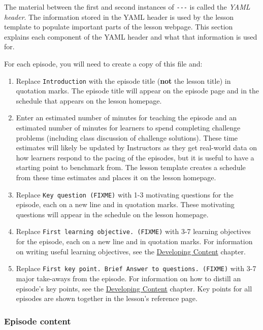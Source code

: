 \documentclass[
]{book}
\providecommand{\tightlist}{%
  \setlength{\itemsep}{0pt}\setlength{\parskip}{0pt}}
\begin{document}
The material between the first and second instances of \texttt{-\/-\/-} is called the \emph{YAML header}. The information
stored in the YAML header is used by the lesson template to populate important parts of the lesson webpage.
This section explains each component of the YAML header and what that information is used for.

For each episode, you will need to create a copy of this file and:

\begin{enumerate}
\def\labelenumi{\arabic{enumi}.}
\tightlist
\item
  Replace \texttt{Introduction} with the episode title (\textbf{not} the lesson title) in quotation marks. The episode
  title will appear on the episode page and in the schedule that appears on the lesson homepage.
\item
  Enter an estimated number of minutes for teaching the episode and an estimated number of minutes for learners to spend completing challenge problems (including class discussion of challenge solutions). These time estimates
  will likely be updated by Instructors as they get real-world data on how learners respond to the pacing of
  the episodes, but it is useful to have a starting point to benchmark from. The lesson template creates a schedule
  from these time estimates and places it on the lesson homepage.
\item
  Replace \texttt{Key\ question\ (FIXME)} with 1-3 motivating questions for the episode, each on a new line and in quotation marks. These motivating questions will appear in the schedule on the lesson homepage.
\item
  Replace \texttt{First\ learning\ objective.\ (FIXME)} with 3-7 learning objectives for the episode, each on a new line and in quotation marks. For information on writing useful learning objectives, see the \href{https://carpentries.github.io/curriculum-development/developing-content.html}{Developing Content} chapter.
\item
  Replace \texttt{First\ key\ point.\ Brief\ Answer\ to\ questions.\ (FIXME)} with 3-7 major take-aways from the episode. For
  information on how to distill an episode's key points, see the \href{https://carpentries.github.io/curriculum-development/developing-content.html}{Developing Content} chapter. Key points for all episodes are shown
  together in the lesson's reference page.
\end{enumerate}

\hypertarget{episode-content}{%
\subsubsection{Episode content}\label{episode-content}}
\end{document}
